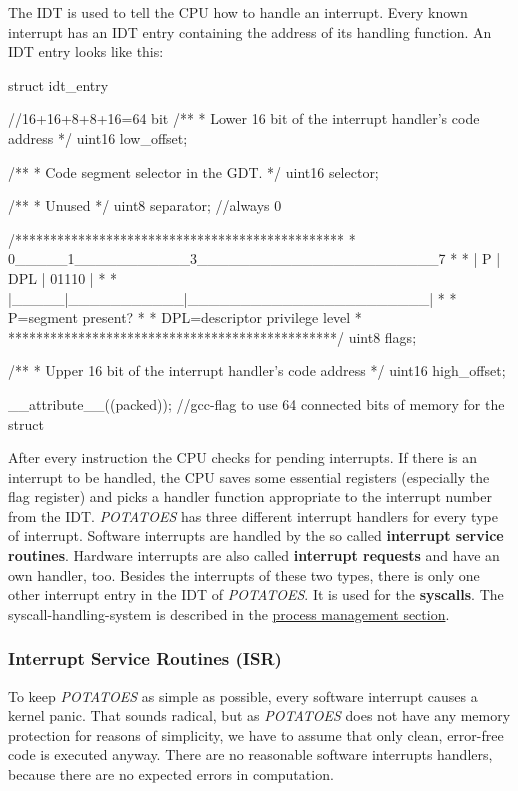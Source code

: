 \documentclass[11pt,a4paper]{scrartcl}
\begin{document}
The IDT is used to tell the CPU how to handle an interrupt. Every known interrupt has an IDT entry containing the address of its handling function. An IDT entry looks like this:
\begin{code}
struct idt_entry{ //16+16+8+8+16=64 bit
	/**
	 * Lower 16 bit of the interrupt handler's code address
	 */
	uint16 low_offset;
	
	/**
	 * Code segment selector in the GDT.
	 */
	uint16 selector;
	
	/**
	 * Unused
	 */
	uint8 separator; //always 0
	
	/***********************************************
	 * 0_____1___________3_______________________7 *
	 * |  P  |    DPL    |	 01110	 | *
	 * |_____|___________|_______________________| *
	 * P=segment present?			  *
	 * DPL=descriptor privilege level	     *
	 ***********************************************/
	uint8 flags;
	
	/**
	 * Upper 16 bit of the interrupt handler's code address
	 */
	uint16 high_offset;
}__attribute__((packed)); //gcc-flag to use 64 connected bits of memory for the struct
\end{code}
After every instruction the CPU checks for pending interrupts. If there is an interrupt to be handled, the CPU saves some essential registers (especially the flag register) and picks a handler function appropriate to the interrupt number from the IDT. \textit{POTATOES} has three different interrupt handlers for every type of interrupt. Software interrupts are handled by the so called \textbf{interrupt service routines}. Hardware interrupts are also called \textbf{interrupt requests} and have an own handler, too. Besides the interrupts of these two types, there is only one other interrupt entry in the IDT of \textit{POTATOES}. It is used for the \textbf{syscalls}. The syscall-handling-system is described in the \hyperlink{SYSCALL}{process management section}.
\subsubsection{Interrupt Service Routines (ISR)}
To keep \textit{POTATOES} as simple as possible, every software interrupt causes a kernel panic. That sounds radical, but as \textit{POTATOES} does not have any memory protection for reasons of simplicity, we have to assume that only clean, error-free code is executed anyway. There are no reasonable software interrupts handlers, because there are no expected errors in computation.
\end{document}
